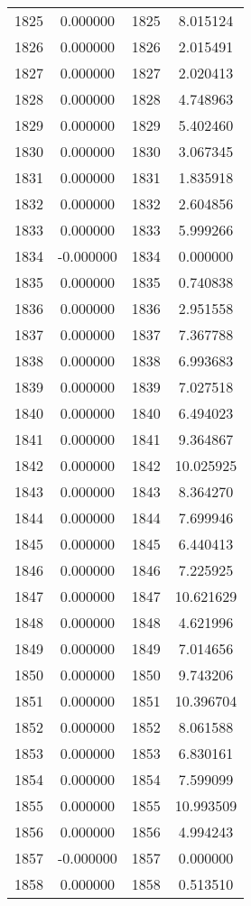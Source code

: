 \documentclass[12pt]{article}
\begin{document}
\begin{longtable}{@{}cccc@{}}
1825 & 0.000000 & 1825 & 8.015124 \\
1826 & 0.000000 & 1826 & 2.015491 \\
1827 & 0.000000 & 1827 & 2.020413 \\
1828 & 0.000000 & 1828 & 4.748963 \\
1829 & 0.000000 & 1829 & 5.402460 \\
1830 & 0.000000 & 1830 & 3.067345 \\
1831 & 0.000000 & 1831 & 1.835918 \\
1832 & 0.000000 & 1832 & 2.604856 \\
1833 & 0.000000 & 1833 & 5.999266 \\
1834 & -0.000000 & 1834 & 0.000000 \\
1835 & 0.000000 & 1835 & 0.740838 \\
1836 & 0.000000 & 1836 & 2.951558 \\
1837 & 0.000000 & 1837 & 7.367788 \\
1838 & 0.000000 & 1838 & 6.993683 \\
1839 & 0.000000 & 1839 & 7.027518 \\
1840 & 0.000000 & 1840 & 6.494023 \\
1841 & 0.000000 & 1841 & 9.364867 \\
1842 & 0.000000 & 1842 & 10.025925 \\
1843 & 0.000000 & 1843 & 8.364270 \\
1844 & 0.000000 & 1844 & 7.699946 \\
1845 & 0.000000 & 1845 & 6.440413 \\
1846 & 0.000000 & 1846 & 7.225925 \\
1847 & 0.000000 & 1847 & 10.621629 \\
1848 & 0.000000 & 1848 & 4.621996 \\
1849 & 0.000000 & 1849 & 7.014656 \\
1850 & 0.000000 & 1850 & 9.743206 \\
1851 & 0.000000 & 1851 & 10.396704 \\
1852 & 0.000000 & 1852 & 8.061588 \\
1853 & 0.000000 & 1853 & 6.830161 \\
1854 & 0.000000 & 1854 & 7.599099 \\
1855 & 0.000000 & 1855 & 10.993509 \\
1856 & 0.000000 & 1856 & 4.994243 \\
1857 & -0.000000 & 1857 & 0.000000 \\
1858 & 0.000000 & 1858 & 0.513510 \\

\end{longtable}
\end{document}
